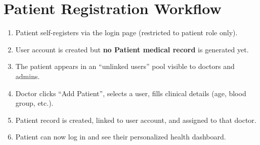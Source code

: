 \section{Patient Registration Workflow}
\begin{enumerate}[leftmargin=*]
    \item Patient self-registers via the login page (restricted to patient role only).
    \item User account is created but \textbf{no Patient medical record} is generated yet.
    \item The patient appears in an ``unlinked users'' pool visible to doctors and admins.
    \item Doctor clicks ``Add Patient'', selects a user, fills clinical details (age, blood group, etc.).
    \item Patient record is created, linked to user account, and assigned to that doctor.
    \item Patient can now log in and see their personalized health dashboard.
\end{enumerate}
